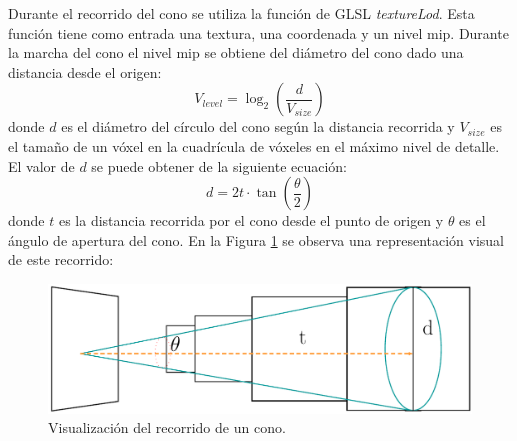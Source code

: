 Durante el recorrido del cono se utiliza la función de GLSL \emph{textureLod}. Esta función tiene como entrada una textura, una coordenada y un nivel mip. Durante la marcha del cono el nivel mip se obtiene del diámetro del cono dado una distancia desde el origen:
\begin{equation}
    V_{level} = \log_2\left(\frac{d}{V_{size}}\right)
\end{equation} donde $d$ es el diámetro del círculo del cono según la distancia recorrida y $V_{size}$ es el tamaño de un vóxel en la cuadrícula de vóxeles en el máximo nivel de detalle. El valor de $d$ se puede obtener de la siguiente ecuación:
\begin{equation}
    d = 2t\cdot\tan\left(\frac{\theta}{2}\right)
\end{equation} donde $t$ es la distancia recorrida por el cono desde el punto de origen y $\theta$ es el ángulo de apertura del cono. En la Figura \ref{fig:cone_trace_impl_fi} se observa una representación visual de este recorrido:
\begin{figure}[H]
    \centering
    \captionsetup{justification=centering}
    \includegraphics[width=.9\linewidth]{media/cone.pdf}
    \caption{Visualización del recorrido de un cono.}
    \label{fig:cone_trace_impl_fi}
\end{figure}

